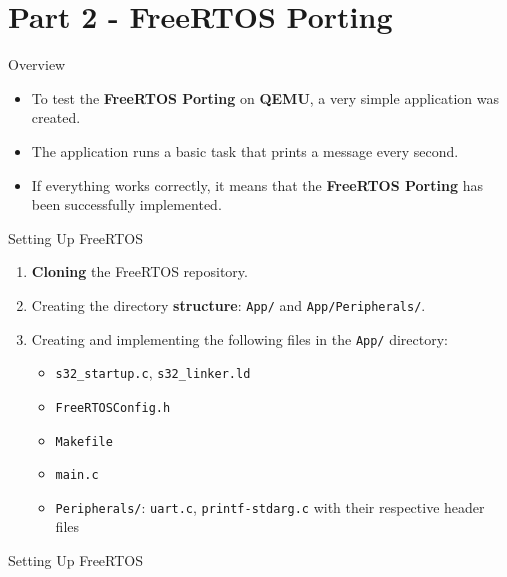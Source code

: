 
\section{Part 2 - FreeRTOS Porting}

\begin{frame}{Overview}
    \begin{itemize}
        \item To test the \textbf{FreeRTOS Porting} on \textbf{QEMU}, a very simple application was created.
        \item The application runs a basic task that prints a message every second.
        \item If everything works correctly, it means that the \textbf{FreeRTOS Porting} has been successfully implemented.
    \end{itemize}
\end{frame}

\begin{frame}{Setting Up FreeRTOS}
    \begin{enumerate}
        \item \textbf{Cloning} the FreeRTOS repository.
        \item Creating the directory \textbf{structure}: \texttt{App/} and \texttt{App/Peripherals/}.
        \item Creating and implementing the following files in the \texttt{App/} directory:
            \begin{itemize}
                \item \texttt{s32\_startup.c}, \texttt{s32\_linker.ld}
                \item \texttt{FreeRTOSConfig.h}
                \item \texttt{Makefile}
                \item \texttt{main.c}
                \item \texttt{Peripherals/}: \texttt{uart.c}, \texttt{printf-stdarg.c} with their respective header files
            \end{itemize}
    \end{enumerate}
\end{frame}

\begin{frame}{Setting Up FreeRTOS}
    

\end{frame}

